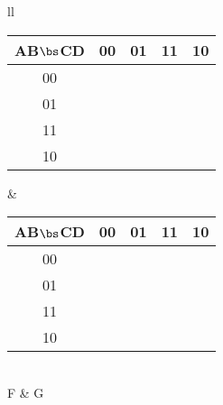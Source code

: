 \begin{description}
    \begin{tabular}{ll}
	    \begin{tabular} {c||c|c|c|c}
	       AB$\bs$CD & 00 & 01 & 11 & 10 \\ \hline \hline
	       00        &    &    &    &    \\ \hline
	       01        &    &    &    &    \\ \hline
	       11        &    &    &    &    \\ \hline
	       10        &    &    &    &    \\
	    \end{tabular}		&
	    \begin{tabular} {c||c|c|c|c}
	       AB$\bs$CD & 00 & 01 & 11 & 10 \\ \hline \hline
	       00        &    &    &    &    \\ \hline
	       01        &    &    &    &    \\ \hline
	       11        &    &    &    &    \\ \hline
	       10        &    &    &    &    \\
	    \end{tabular}		\\
	F & G \vspace{0.1in}\\ 
	\end{tabular}

\end{description}

